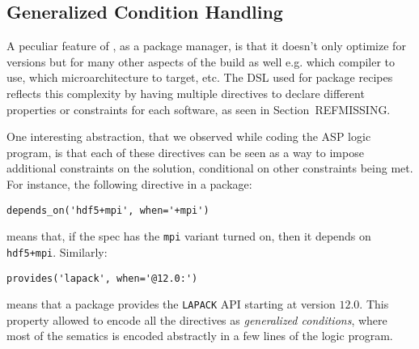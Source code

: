 \subsection{Generalized Condition Handling}
A peculiar feature of \spack, as a package manager, is that it doesn't only optimize for versions but for many other aspects of the build as well e.g. which compiler to use, which microarchitecture to target, etc. 
The DSL used for package recipes reflects this complexity by having multiple directives to declare different properties or constraints for each software, as seen in Section~REFMISSING. 

One interesting abstraction, that we observed while coding the ASP logic program, is that each of these directives can be seen as a way to impose additional constraints on the solution, conditional on other constraints 
being met. For instance, the following directive in a package:
\begin{verbatim}
depends_on('hdf5+mpi', when='+mpi')
\end{verbatim}
means that, if the spec has the \texttt{mpi} variant turned on, then it depends on \texttt{hdf5+mpi}. Similarly:
\begin{verbatim}
provides('lapack', when='@12.0:')
\end{verbatim}
means that a package provides the \texttt{LAPACK} API starting at version $12.0$.
This property allowed to encode all the directives as \emph{generalized conditions}, where most of the sematics is encoded abstractly in a few lines of the logic program.

